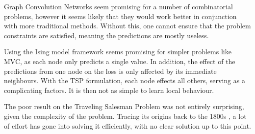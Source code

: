 Graph Convolution Networks seem promising for a number of combinatorial problems, however it seems likely that they would work better in conjunction with more traditional methods.
Without this, one cannot ensure that the problem constraints are satisfied, meaning the predictions are mostly useless.

Using the Ising model framework seems promising for simpler problems like MVC, as each node only predicts a single value.
In addition, the effect of the predictions from one node on the loss is only affected by its immediate neighbours.
With the TSP formulation, each node effects all others, serving as a complicating factors.
It is then not as simple to learn local behaviour.

The poor result on the Traveling Salesman Problem was not entirely surprising, given the complexity of the problem.
Tracing its origins back to the 1800s \cite{TSP_history}, a lot of effort has gone into solving it efficiently, with no clear solution up to this point.


